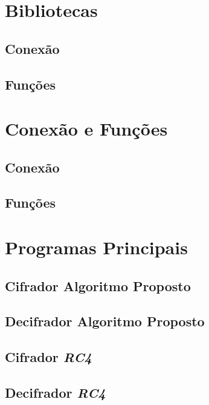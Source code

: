 \section{Bibliotecas}
\subsection{Conexão}

\subsection{Funções}

\section{Conexão e Funções}
\subsection{Conexão}

\subsection{Funções}

\section{Programas Principais}
\subsection{Cifrador Algoritmo Proposto}

\subsection{Decifrador Algoritmo Proposto}

\subsection{Cifrador \textit{RC4}}

\subsection{Decifrador \textit{RC4}}
